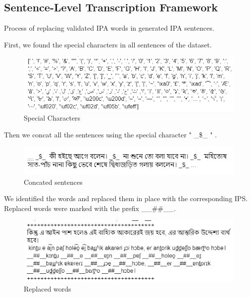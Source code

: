 \subsection{Sentence-Level Transcription Framework}

Process of replacing validated IPA words in generated IPA sentences.


First, we found the special characters in all sentences of the dataset.
        \begin{figure}[h!]
            \centering
            \includegraphics[scale=1]{Images/Screenshot/Special-char.png}
            \caption{Special Characters}
            \label{fig: Special Characters}
        \end{figure}

Then we concat all the sentences using the special character " \_\$\_ " .


        \begin{figure}[h!]
            \centering
            \includegraphics[scale=1]{Images/Screenshot/sentence-concat.png}
            \caption{Concated sentences}
            \label{fig: Concated sentences}
        \end{figure}
   
We identified the words and replaced them in place with the corresponding IPS.
Replaced words were marked with the prefix \_\_\#\#\_\_.

        \begin{figure}[h!]
            \centering
            \includegraphics[scale=0.8]{Images/Screenshot/replace-word.png}
                \caption{Replaced words}
            \label{fig: Replaced words}
        \end{figure}
        


